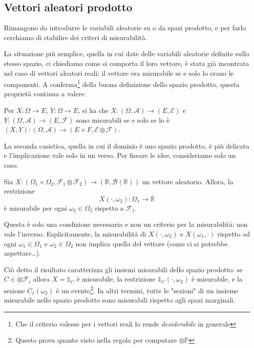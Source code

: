 \subsection{Vettori aleatori prodotto}

Rimangono da introdurre le variabili aleatorie su o da spazi prodotto, e per farlo cerchiamo di stabilire dei criteri di misurabilità.

La situazione più semplice, quella in cui date delle variabili aleatorie definite sullo stesso spazio, ci chiediamo come si comporta il loro vettore, è stata già incontrata nel caso di vettori aleatori reali: il vettore era misurabile se e solo lo erano le componenti. A conferma\footnote{Che il criterio valesse per i vettori reali lo rende \textit{desiderabile} in generale} della buona definizione dello spazio prodotto, questa proprietà continua a valere.
\begin{my_lemma}
	Per $X: \Omega \to E$, $Y: \Omega \to E$, si ha che $X:(\Omega,\mathcal{A}) \to (E,\mathcal{E})$ e $Y:(\Omega,\mathcal{A}) \to (E,\mathcal{F})$ sono misurabili se e solo se lo è $(X,Y):(\Omega,\mathcal{A}) \to (E \times F,\mathcal{E} \otimes \mathcal{F})$.
\end{my_lemma}

La seconda casistica, quella in cui il dominio è uno spazio prodotto, è più delicata e l'implicazione vale solo in un verso. Per fissare le idee, consideriamo solo un caso.
\begin{my_lemma}
	Sia $X : (\Omega_1 \times \Omega_2, \mathcal{F}_1 \otimes \mathcal{F}_2) \to (\mathbb{R}, \mathcal{B}(\mathbb{R}))$ un vettore aleatorio. Allora, la restrizione
	\[
		X(\boldsymbol{\cdot},\omega_2):\Omega_1 \to \mathbb{R}
	\]
	è misurabile per ogni $\omega_2 \in \Omega_2$ rispetto a $\mathcal{F}_1$.
\end{my_lemma}
Questa è solo una condizione necessaria e non un criterio per la misurabilità: non vale l'inverso. Esplicitamente, la misurabilità di $X(\cdot,\omega_2)$ e $X(\omega_1, \cdot)$ rispetto ad ogni $\omega_1 \in \Omega_1$ e $\omega_2 \in \Omega_2$ non implica quella del vettore (come ci si potrebbe aspettare\dots).

Ciò detto il risultato caratterizza gli insiemi misurabili dello spazio prodotto: se $C \in \otimes \mathcal{F}_i$ allora $X = \mathbb{1}_C$ è misurabile, la restrizione $\mathbb{1}_C(\boldsymbol{\cdot},\omega_2)$ è misurabile, e la sezione $C_1(\omega_2)$ è un evento\footnote{Questo prova quanto visto nella regola per computare $\otimes \mathbb{P}$}. In altri termini, tutte le "sezioni" di un insieme misurabile nello spazio prodotto sono misurabili rispetto agli spazi marginali.

